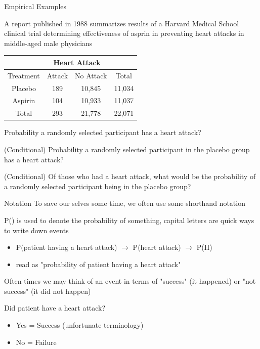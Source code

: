 \documentclass{beamer}
\begin{document}
\begin{frame}{Empirical Examples}

{\scriptsize A report published in 1988 summarizes results of a Harvard Medical School clinical trial determining effectiveness of asprin in preventing heart attacks in middle-aged male physicians}

\begin{table}
    \centering
    \begin{tabular}{|c|c|c|c|} \hline  
         &  \multicolumn{2}{|c|}{Heart Attack}& \\ \hline  
         Treatment&  Attack&  No Attack& Total\\ \hline  
         Placebo&  189&  10,845& 11,034\\ \hline  
         Aspirin&  104&  10,933& 11,037\\ \hline  
         Total&  293&  21,778& 22,071\\ \hline 
    \end{tabular}
\end{table} \vspace{3mm}
\scriptsize
Probability a randomly selected participant has a heart attack? \vspace{3mm}

(Conditional) Probability a randomly selected participant in the placebo group has a heart attack? \vspace{3mm}

(Conditional) Of those who had a heart attack, what would be the probability of a randomly selected participant being in the placebo group?
\end{frame}

\begin{frame}{Notation}
To save our selves some time, we often use some shorthand notation\vspace{6mm}

P() is used to denote the probability of something, capital letters are quick ways to write down events
\begin{itemize}
    \item P(patient having a heart attack) $\rightarrow$ P(heart attack) $\rightarrow$ P(H)
    \item read as "probability of patient having a heart attack"
\end{itemize} \vspace{8mm}

Often times we may think of an event in terms of "success" (it happened) or "not success" (it did not happen) \vspace{3mm}

Did patient have a heart attack?
\begin{itemize}
    \item Yes = Success (unfortunate terminology)
    \item No = Failure
\end{itemize}
\end{frame}
\end{document}

